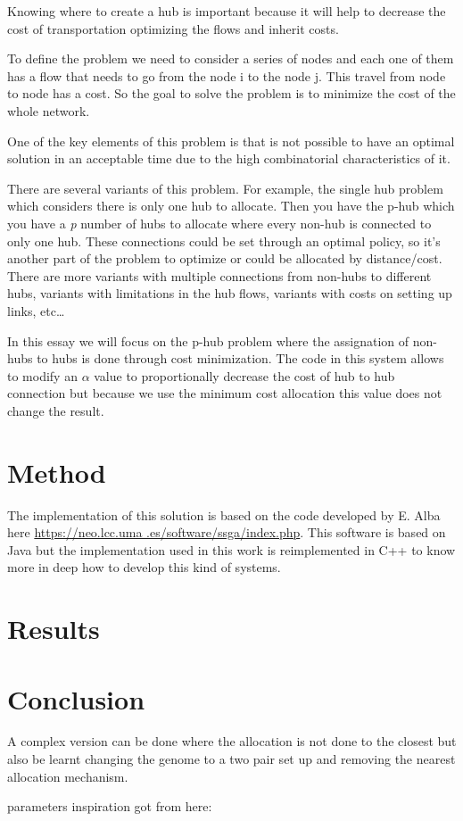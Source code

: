 \documentclass[12pt,oneside,a4paper]{article}
\begin{document}
    Knowing where to create a hub is important because it will help to decrease the cost of transportation optimizing
    the flows and inherit costs.

    To define the problem we need to consider a series of nodes and each one of them has a flow that needs to go from
    the node i to the node j.
    This travel from node to node has a cost.
    So the goal to solve the problem is to minimize the cost of the whole network.

    One of the key elements of this problem is that is not possible to have an optimal solution in an acceptable time
    due to the high combinatorial characteristics of it.

    There are several variants of this problem.
    For example, the single hub problem which considers there is only one hub to allocate.
    Then you have the p-hub which you have a \textit{p} number of hubs to allocate where every non-hub is connected
    to only one hub.
    These connections could be set through an optimal policy, so it's another part of the problem to optimize or could
    be allocated by distance/cost.
    There are more variants with multiple connections from non-hubs to different hubs, variants with limitations in
    the hub flows, variants with costs on setting up links, etc\ldots


    In this essay we will focus on the p-hub problem where the assignation of non-hubs to hubs is done through cost
    minimization.
    The code in this system allows to modify an \(\alpha\) value to proportionally decrease the cost of hub to hub
    connection but because we use the minimum cost allocation this value does not change the result.


    \section{Method}
    The implementation of this solution is based on the code developed by E. Alba here \url{https://neo.lcc.uma
.es/software/ssga/index.php}.
    This software is based on Java but the implementation used in this work is reimplemented in C++ to know more in
    deep how to develop this kind of systems.


    \section{Results}


    \section{Conclusion}

    A complex version can be done where the allocation is not done to the closest but also be learnt changing the
    genome to a two pair set up and removing the nearest allocation mechanism. \cite{Capacitated_allo_Zorica}


    parameters inspiration got from here: \cite{Zhou2016/09}


    \newpage
    
    
\end{document}
